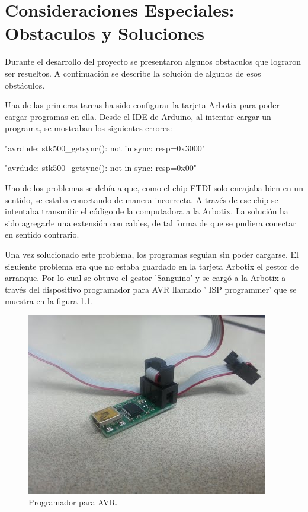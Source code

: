 \chapter{Consideraciones Especiales: Obstaculos y Soluciones} \label{chapter:consideraciones}

Durante el desarrollo del proyecto se presentaron algunos obstaculos que lograron ser resueltos. A continuación se describe la solución de algunos de esos obstáculos. 

Una de las primeras tareas ha sido configurar la tarjeta Arbotix para poder cargar programas en ella. Desde el IDE de Arduino, al intentar cargar un programa, se mostraban los siguientes errores:

"avrdude: stk500\_getsync(): not in sync: resp=0x3000"

"avrdude: stk500\_getsync(): not in sync: resp=0x00"

Uno de los problemas se debía a que, como el chip FTDI solo encajaba bien en un sentido, se estaba conectando de manera incorrecta. A través de ese chip se intentaba transmitir el código de la computadora a la Arbotix. La solución ha sido agregarle una extensión con cables, de tal forma de que se pudiera conectar en sentido contrario. 

Una vez solucionado este problema, los programas seguian sin poder cargarse. El siguiente problema era que no estaba guardado en la tarjeta Arbotix el gestor de arranque. Por lo cual se obtuvo el gestor 'Sanguino' y se cargó a la Arbotix a través del dispositivo programador para AVR llamado ' ISP programmer' que se muestra en la figura \ref{fig:ISPprog}. 

\begin{figure}[hbtp]
\centering
\includegraphics[scale=0.3]{imagenes/ISP.jpg}
\caption{Programador para AVR.}
\label{fig:ISPprog}
\end{figure}


